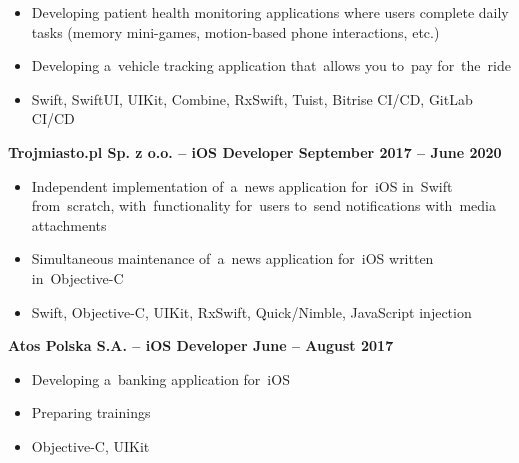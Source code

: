 \documentclass[11pt,a4paper]{article}
\begin{document}
    \vspace{-.23cm}
    \begin{itemize}[leftmargin=1.5cm] \itemsep.2mm \parskip0mm 
        \item Developing patient health monitoring applications where users complete daily tasks
            (memory mini-games, motion-based phone interactions, etc.)
        \item Developing a~vehicle tracking application that~allows you to~pay for~the~ride

        \vspace{0.1cm}
        \setlength\itemindent{-1em}
        \item[] {\small{\color{CadetBlue}{\bf Tech stack:}}
            Swift,
            SwiftUI,
            UIKit,
            Combine,
            RxSwift,
            Tuist,
            Bitrise CI/CD,
            GitLab CI/CD
        }
    \end{itemize}

    \vspace{-.17cm}

    {\bf Trojmiasto.pl Sp. z o.o. -- iOS Developer \hfill September 2017 -- June 2020}

    \vspace{-.23cm}
    \begin{itemize}[leftmargin=1.5cm] \itemsep.2mm \parskip0mm 
        \item Independent implementation of~a~news application for~iOS in~Swift from~scratch,
            with~functionality for~users to~send notifications with~media attachments
        \item Simultaneous maintenance of~a~news application for~iOS written in~Objective-C

        \vspace{0.1cm}
        \setlength\itemindent{-1em}
        \item[] {\small{\color{CadetBlue}{\bf Tech stack:}}
            Swift,
            Objective-C,
            UIKit,
            RxSwift,
            Quick/Nimble,
            JavaScript injection
        }
    \end{itemize}

    \vspace{-.17cm}

    {\bf Atos Polska S.A. -- iOS Developer \hfill June -- August 2017}

    \vspace{-.23cm}
    \begin{itemize}[leftmargin=1.5cm] \itemsep.2mm \parskip0mm 
        \item Developing a~banking application for~iOS
        \item Preparing trainings

        \vspace{0.1cm}
        \setlength\itemindent{-1em}
        \item[] {\small{\color{CadetBlue}{\bf Tech stack:}}
            Objective-C,
            UIKit
        }
    \end{itemize}
\end{document}
